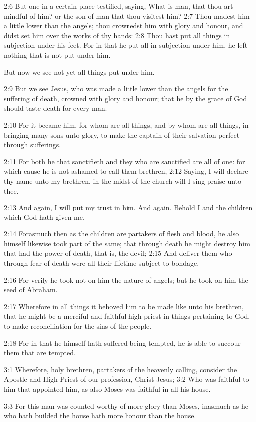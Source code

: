 2:6 But one in a certain place testified, saying, What is man, that
thou art mindful of him? or the son of man that thou visitest him?
2:7 Thou madest him a little lower than the angels; thou crownedst him
with glory and honour, and didst set him over the works of thy hands:
2:8 Thou hast put all things in subjection under his feet. For in that
he put all in subjection under him, he left nothing that is not put
under him.

But now we see not yet all things put under him.

2:9 But we see Jesus, who was made a little lower than the angels for
the suffering of death, crowned with glory and honour; that he by the
grace of God should taste death for every man.

2:10 For it became him, for whom are all things, and by whom are all
things, in bringing many sons unto glory, to make the captain of their
salvation perfect through sufferings.

2:11 For both he that sanctifieth and they who are sanctified are all
of one: for which cause he is not ashamed to call them brethren, 2:12
Saying, I will declare thy name unto my brethren, in the midst of the
church will I sing praise unto thee.

2:13 And again, I will put my trust in him. And again, Behold I and
the children which God hath given me.

2:14 Forasmuch then as the children are partakers of flesh and blood,
he also himself likewise took part of the same; that through death he
might destroy him that had the power of death, that is, the devil;
2:15 And deliver them who through fear of death were all their
lifetime subject to bondage.

2:16 For verily he took not on him the nature of angels; but he took
on him the seed of Abraham.

2:17 Wherefore in all things it behoved him to be made like unto his
brethren, that he might be a merciful and faithful high priest in
things pertaining to God, to make reconciliation for the sins of the
people.

2:18 For in that he himself hath suffered being tempted, he is able to
succour them that are tempted.

3:1 Wherefore, holy brethren, partakers of the heavenly calling,
consider the Apostle and High Priest of our profession, Christ Jesus;
3:2 Who was faithful to him that appointed him, as also Moses was
faithful in all his house.

3:3 For this man was counted worthy of more glory than Moses, inasmuch
as he who hath builded the house hath more honour than the house.

